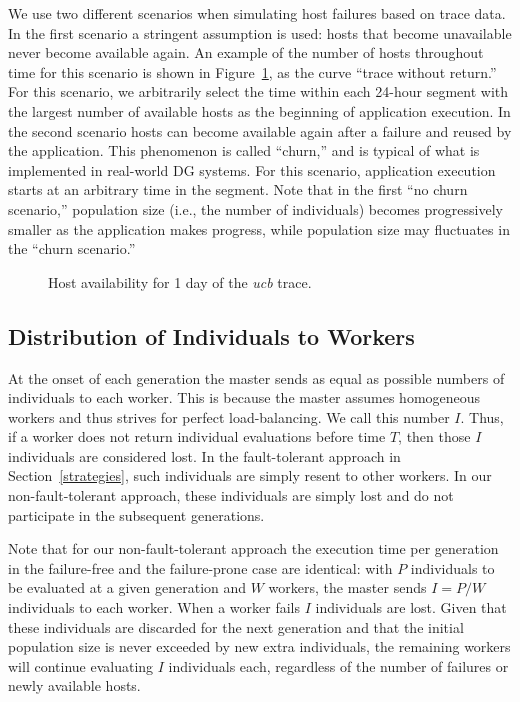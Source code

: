 \documentclass[graybox]{sty/svmult}
\begin{document}
We use two different scenarios when simulating host failures based
on trace data. In the first scenario a stringent assumption is used: hosts
that become unavailable never become available again. An example
of the number of hosts throughout time for this scenario is shown in
Figure~\ref{fig:trazas2}, as the curve ``trace without return.''  For this
scenario, we arbitrarily select the time within each 24-hour segment with
the largest number of available hosts as the beginning of application
execution.  In the second scenario hosts can become available again after a
failure and
reused by the application. This phenomenon is called ``churn,'' and 
is typical of what is implemented in real-world DG systems. For
this scenario, application execution starts at an arbitrary time in
the segment.  Note that in the first ``no churn scenario,'' population
size (i.e., the number of individuals) becomes progressively smaller as the
application makes progress, while population size may fluctuates in the
``churn scenario.''

\begin{figure}
    \begin{center}
    \end{center}
    \caption{\label{fig:trazas2}Host availability for 1 day of the \emph{ucb} trace.}
\end{figure}

\subsection{Distribution of Individuals to Workers}
\label{distribution-individuals}

At the onset of each generation the master sends as equal as possible
numbers of individuals to each worker.  This is because the master assumes
homogeneous workers and thus strives for perfect load-balancing. We call
this number $I$. Thus, if a worker does not return individual evaluations
before time $T$, then those $I$ individuals are considered lost. In the
fault-tolerant approach in Section~\ref{strategies}, such individuals
are simply resent to other workers. In our non-fault-tolerant approach,
these individuals are simply lost and do not participate in the
subsequent generations. 

Note that for our non-fault-tolerant approach the execution time per
generation in the failure-free and the failure-prone case are
identical: with $P$ individuals to be evaluated at a given generation
and $W$ workers, the master sends $I=P/W$ individuals to
each worker.  When a worker fails $I$ individuals are lost.  Given
that these individuals are discarded for the next generation and that the
initial population size is never exceeded by new extra individuals,
the remaining workers will continue evaluating $I$ individuals each,
regardless of the number of failures or newly available hosts.
\end{document}
